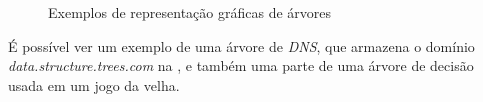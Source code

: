 \begin{figure}[h!]
    \centering
      \caption[Exemplos de representação gráficas de árvores]{Exemplos de representação gráficas de árvores}
      \qquad
      \label{fig:example-tree}
\end{figure}
É possível ver um exemplo de uma árvore de \textit{DNS},  que armazena o domínio \textit{data.structure.trees.com} na , e também uma parte de uma árvore de decisão usada em um jogo da velha.


